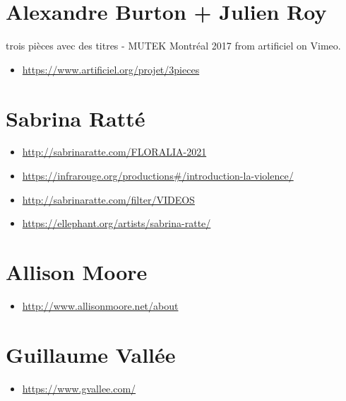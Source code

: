 \documentclass[
  french,
]{book}
\providecommand{\tightlist}{%
  \setlength{\itemsep}{0pt}\setlength{\parskip}{0pt}}
\begin{document}
\hypertarget{alexandre-burton-julien-roy}{%
\section{Alexandre Burton + Julien Roy}\label{alexandre-burton-julien-roy}}

trois pièces avec des titres - MUTEK Montréal 2017 from artificiel on Vimeo.

\begin{itemize}
\tightlist
\item
  \url{https://www.artificiel.org/projet/3pieces}
\end{itemize}

\hypertarget{sabrina-rattuxe9}{%
\section{Sabrina Ratté}\label{sabrina-rattuxe9}}

\begin{itemize}
\tightlist
\item
  \url{http://sabrinaratte.com/FLORALIA-2021}
\item
  \url{https://infrarouge.org/productions\#/introduction-la-violence/}
\item
  \url{http://sabrinaratte.com/filter/VIDEOS}
\item
  \url{https://ellephant.org/artists/sabrina-ratte/}
\end{itemize}

\hypertarget{allison-moore}{%
\section{Allison Moore}\label{allison-moore}}

\begin{itemize}
\tightlist
\item
  \url{http://www.allisonmoore.net/about}
\end{itemize}

\hypertarget{guillaume-valluxe9e}{%
\section{Guillaume Vallée}\label{guillaume-valluxe9e}}

\begin{itemize}
\tightlist
\item
  \url{https://www.gvallee.com/}
\end{itemize}
\end{document}
